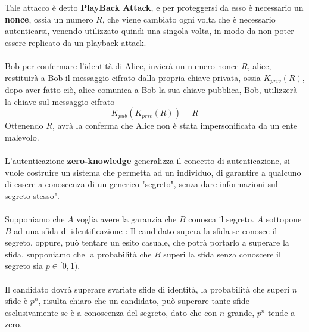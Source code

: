 \documentclass[12pt, letterpaper]{article}
\newcommand{\acc}{\\\hphantom{}\\}
\begin{document}
Tale attacco è detto \textbf{PlayBack Attack}, e per proteggersi da esso è necessario un 
\textbf{nonce}, ossia un numero $R$, che viene cambiato ogni volta che è necessario 
autenticarsi, venendo utilizzato quindi una singola volta, in modo da non poter essere replicato da un playback 
attack.\acc 
Bob per confermare l'identità di Alice, invierà un numero nonce $R$, alice, restituirà a Bob il messaggio cifrato 
dalla propria chiave privata, ossia $K_{priv}(R)$, dopo aver fatto ciò, alice comunica a Bob la sua chiave pubblica, 
Bob, utilizzerà la chiave sul messaggio cifrato 
$$ K_{pub}(K_{priv}(R))=R$$
Ottenendo $R$, avrà la conferma che Alice non è stata impersonificata da un ente malevolo.
\acc
L'autenticazione \textbf{zero-knowledge} generalizza il concetto di autenticazione, si vuole costruire un sistema 
che permetta ad un individuo, di garantire a qualcuno di essere a conoscenza di un generico "segreto", senza 
dare informazioni sul segreto stesso".\acc 
Supponiamo che $A$ voglia avere la garanzia che $B$ conosca il segreto.
 $A$ sottopone $B$ ad una sfida di identificazione : Il candidato supera la sfida se conosce il segreto, oppure, può 
 tentare un esito casuale, che potrà portarlo a superare la sfida, supponiamo che la probabilità che $B$ superi la sfida
 senza conoscere il segreto sia $p\in [0,1)$. \acc 
 Il candidato dovrà superare svariate sfide di identità, la probabilità che superi $n$ sfide è $p^n$, risulta chiaro 
 che un candidato, può superare tante sfide esclusivamente se è a conoscenza del segreto, dato che con $n$ grande, 
 $p^n$ tende a zero.
\end{document}
